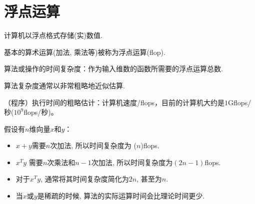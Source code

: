 \section{浮点运算}

计算机以浮点格式存储(实)数值. 

基本的算术运算(加法, 乘法等)被称为浮点运算(flop). 

算法或操作的时间复杂度：作为输入维数的函数所需要的浮点运算总数. 

算法复杂度通常以非常粗略地近似估算. 

（程序）执行时间的粗略估计：计算机速度/flops，目前的计算机大约是$1$Gflops/秒($10^9$flops/秒)。

\begin{corollary}
    假设有$n$维向量$x$和$y$：

    \begin{itemize}
        \item $x+y$需要$n$次加法, 所以时间复杂度为 ($n$)flops. 
        \item $x^T y$ 需要$n$次乘法和$n - 1$次加法, 所以时间复杂度为$(2n - 1)$flops. 
        \item 对于$x^T y$, 通常将其时间复杂度简化为$2n$, 甚至为$n$. 
        \item 当$x$或$y$是稀疏的时候, 算法的实际运算时间会比理论时间更少. 
    \end{itemize}
\end{corollary}




